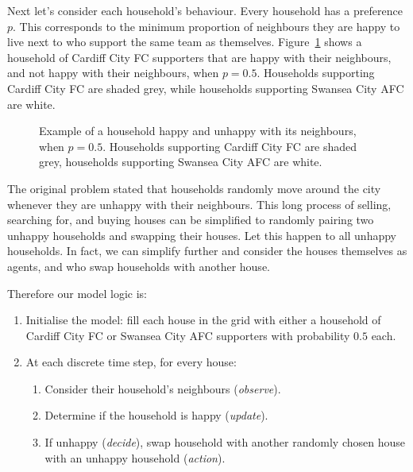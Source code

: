 Next let's consider each household's behaviour.
Every household has a preference $p$.
This corresponds to the minimum proportion of neighbours they are happy to live
next to who support the same team as themselves.
Figure~\ref{fig:schelling_happyunhappy} shows a household of Cardiff City FC
supporters that are happy with their neighbours, and not happy with their
neighbours, when $p=0.5$. Households supporting Cardiff City FC are shaded grey,
while households supporting Swansea City AFC are white.

\begin{figure}
\begin{center}
\subfigure[A happy household, with 6 similar neighbours ($\frac{6}{8} > p = 0.5$)]{}
\subfigure[An unhappy household, with 2 similar neighbours ($\frac{2}{8} < p = 0.5$)]{}
\end{center}
\caption{Example of a household happy and unhappy with its neighbours, when
$p=0.5$. Households supporting Cardiff City FC are shaded grey, households
supporting Swansea City AFC are white.}
\label{fig:schelling_happyunhappy}
\end{figure}

The original problem stated that households randomly move around the city
whenever they are unhappy with their neighbours.
This long process of selling, searching for, and buying houses can be simplified
to randomly pairing two unhappy households and swapping their houses.
Let this happen to all unhappy households.
In fact, we can simplify further and consider the houses themselves as agents,
and who swap households with another house.

Therefore our model logic is:

\begin{enumerate}
  \item Initialise the model: fill each house in the grid with either a
  household of Cardiff City FC or Swansea City AFC supporters with
  probability $0.5$ each.
  \item At each discrete time step, for every house:
  \begin{enumerate}
    \item Consider their household's neighbours (\textit{observe}).
    \item Determine if the household is happy (\textit{update}).
    \item If unhappy (\textit{decide}), swap household with another randomly
    chosen house with an unhappy household (\textit{action}).
  \end{enumerate}
\end{enumerate}

